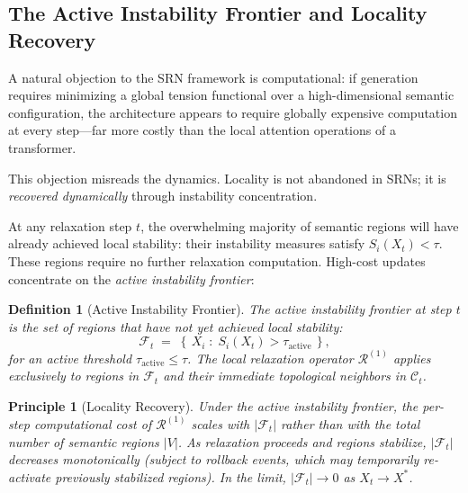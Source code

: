\documentclass[11pt, a4paper]{article}
\theoremstyle{srn}
\newtheorem{definition}{Definition}[section]
\newtheorem{principle}{Principle}[section]
\theoremstyle{srnremark}
\newcommand{\Cstruct}{\mathcal{C}}           %
\newcommand{\Rop}{\mathcal{R}}           %
\begin{document}
\subsection{The Active Instability Frontier and Locality Recovery}
\label{subsec:frontier}

A natural objection to the SRN framework is computational: if
generation requires minimizing a global tension functional over a
high-dimensional semantic configuration, the architecture appears to
require globally expensive computation at every step---far more costly
than the local attention operations of a transformer.

This objection misreads the dynamics.
Locality is not abandoned in SRNs; it is \emph{recovered dynamically}
through instability concentration.

At any relaxation step $t$, the overwhelming majority of semantic
regions will have already achieved local stability: their instability
measures satisfy $S_i(X_t) < \tau$.
These regions require no further relaxation computation.
High-cost updates concentrate on the \emph{active instability
frontier}:

\begin{definition}[Active Instability Frontier]
\label{def:frontier}
The \emph{active instability frontier} at step $t$ is the set of
regions that have not yet achieved local stability:
\[
  \mathcal{F}_t
  \;=\;
  \left\{\, X_i \;:\; S_i(X_t) > \tau_{\mathrm{active}} \,\right\},
\]
for an active threshold $\tau_{\mathrm{active}} \leq \tau$.
The local relaxation operator $\Rop^{(1)}$ applies exclusively to
regions in $\mathcal{F}_t$ and their immediate topological neighbors
in $\Cstruct_t$.
\end{definition}

\begin{principle}[Locality Recovery]
\label{prin:locality}
Under the active instability frontier, the per-step computational cost
of $\Rop^{(1)}$ scales with $|\mathcal{F}_t|$ rather than with the
total number of semantic regions $|V|$.
As relaxation proceeds and regions stabilize, $|\mathcal{F}_t|$
decreases monotonically (subject to rollback events, which may
temporarily re-activate previously stabilized regions).
In the limit, $|\mathcal{F}_t| \to 0$ as $X_t \to X^*$.
\end{principle}
\end{document}
